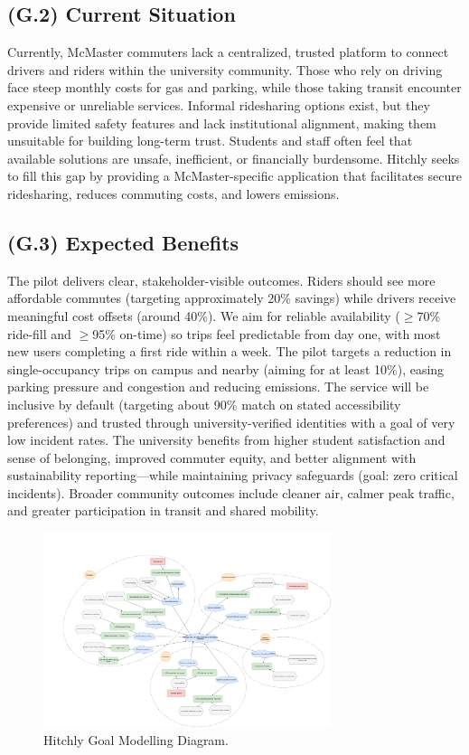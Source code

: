 \documentclass[12pt,letterpaper]{article}
\begin{document}
\subsection{(G.2) Current Situation}
Currently, McMaster commuters lack a centralized, trusted platform to connect drivers and riders within the university community. Those who rely on driving face steep monthly costs for gas and parking, while those taking transit encounter expensive or unreliable services. Informal ridesharing options exist, but they provide limited safety features and lack institutional alignment, making them unsuitable for building long-term trust. Students and staff often feel that available solutions are unsafe, inefficient, or financially burdensome. Hitchly seeks to fill this gap by providing a McMaster-specific application that facilitates secure ridesharing, reduces commuting costs, and lowers emissions. 

\subsection{(G.3) Expected Benefits}
The pilot delivers clear, stakeholder-visible outcomes. Riders should see more affordable commutes (targeting approximately 20\% savings) while drivers receive meaningful cost offsets (around 40\%). We aim for reliable availability ($\geq$70\% ride-fill and $\geq$95\% on-time) so trips feel predictable from day one, with most new users completing a first ride within a week. The pilot targets a reduction in single-occupancy trips on campus and nearby (aiming for at least 10\%), easing parking pressure and congestion and reducing emissions. The service will be inclusive by default (targeting about 90\% match on stated accessibility preferences) and trusted through university-verified identities with a goal of very low incident rates. The university benefits from higher student satisfaction and sense of belonging, improved commuter equity, and better alignment with sustainability reporting---while maintaining privacy safeguards (goal: zero critical incidents). Broader community outcomes include cleaner air, calmer peak traffic, and greater participation in transit and shared mobility.

\begin{figure}[htbp]
  \centering
  \includegraphics[width=0.75\textwidth]{goal_model.png}
  \caption{Hitchly Goal Modelling Diagram.}
  \label{fig:ride-matching}
\end{figure}
\end{document}
